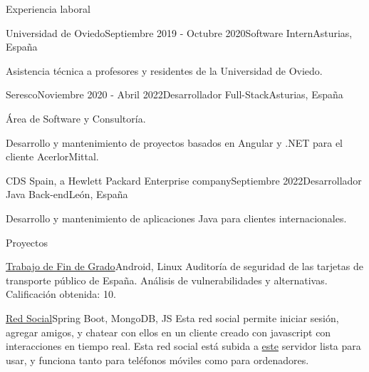 \documentclass{resume} %
\begin{document}
\begin{rSection}{Experiencia laboral}


\begin{rSubsection}{Universidad de Oviedo}{Septiembre 2019 - Octubre 2020}{Software Intern}{Asturias, España}
\item Asistencia técnica a profesores y residentes de la Universidad de Oviedo.
\end{rSubsection}

\begin{rSubsection}{Seresco}{Noviembre 2020 - Abril 2022}{Desarrollador Full-Stack}{Asturias, España}
\item Área de Software y Consultoría.
\item Desarrollo y mantenimiento de proyectos basados en Angular y .NET para el cliente AcerlorMittal.
\end{rSubsection}

\begin{rSubsection}{CDS Spain, a Hewlett Packard Enterprise company}{Septiembre 2022}{Desarrollador Java Back-end}{León, España}
\item Desarrollo y mantenimiento de aplicaciones Java para clientes internacionales.
\end{rSubsection}

\end{rSection}


\begin{rSection}{Proyectos}


\begin{rSubsection}{\href{https://github.com/alexl0/tfg}{Trabajo de Fin de Grado}}{Android, Linux}{}{}
Auditoría de seguridad de las tarjetas de transporte público de España. Análisis de vulnerabilidades y alternativas.
Calificación obtenida: 10.
\end{rSubsection}

\begin{rSubsection}{\href{https://chatwithyouwant.herokuapp.com}{Red Social}}{Spring Boot, MongoDB, JS}{}{}
Esta red social permite iniciar sesión, agregar amigos, y chatear con ellos en un cliente creado con javascript con interacciones en tiempo real.
Esta red social está subida a \href{https://chatwithyouwant.herokuapp.com}{este} servidor lista para usar, y funciona tanto para teléfonos móviles como para ordenadores.
\end{rSubsection}


\end{rSection}
\end{document}

